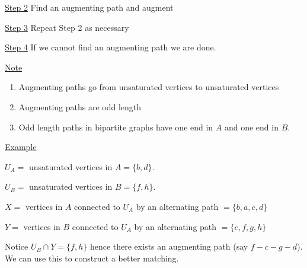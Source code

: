 \documentclass{article}
\begin{document}
\underline{Step 2} Find an augmenting path and augment

\underline{Step 3} Repeat Step 2 as necessary

\underline{Step 4} If we cannot find an augmenting path we are done. 

\underline{Note}

\begin{enumerate}
    \item Augmenting paths go from unsaturated vertices to unsaturated vertices
    \item Augmenting paths are odd length
    \item Odd length paths in bipartite graphs have one end in $A$ and one end in $B$. 
\end{enumerate}

\underline{Example}

\begin{center}
\end{center}

$U_A = $ unsaturated vertices in $A = \{b,d\}$.

$U_B = $ unsaturated vertices in $B = \{f,h\}$.

$X = $ vertices in $A$ connected to $U_A$ by an alternating path $= \{b,a,c,d\}$

$Y = $ vertices in $B$ connected to $U_A$ by an alternating path $= \{e,f,g,h\}$

Notice $U_B \cap Y = \{f,h\}$ hence there exists an augmenting path (say $f-c-g-d$). We can use this to construct a better matching.
\end{document}
